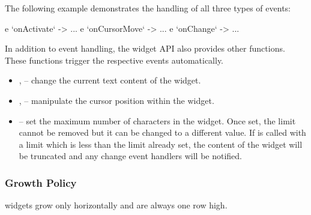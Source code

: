 The following example demonstrates the handling of all three types of
events:

\begin{haskellcode}
 e `onActivate` \this -> ...
 e `onCursorMove` \pos -> ...
 e `onChange` \newVal -> ...
\end{haskellcode}

In addition to event handling, the  widget API also provides
other functions.  These functions trigger the respective events
automatically.

\begin{itemize}
\item {},  -- change the current text
  content of the  widget.
\item {},  --
  manipulate the cursor position within the  widget.
\item {} -- set the maximum number of characters in
  the  widget.  Once set, the limit cannot be removed but it
  can be changed to a different value.  If  is
  called with a limit which is less than the limit already set, the
  content of the  widget will be truncated and any change
  event handlers will be notified.
\end{itemize}

\subsubsection{Growth Policy}

 widgets grow only horizontally and are always one row high.
